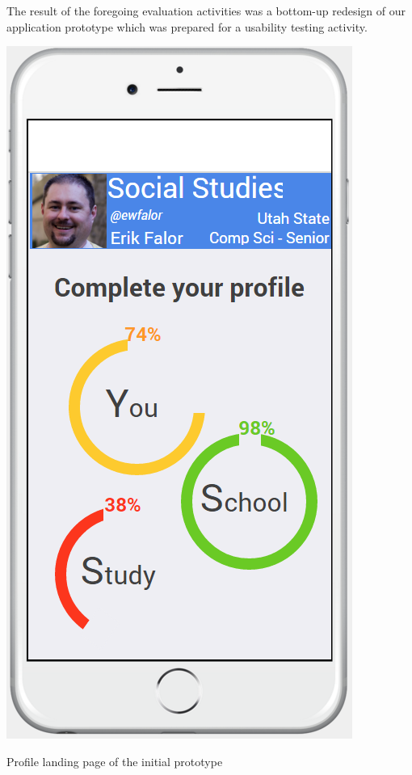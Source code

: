 \documentclass{sigchi-ext}
\begin{document}
The result of the foregoing evaluation activities was a bottom-up redesign of
our application prototype which was prepared for a usability testing activity.



\begin{marginfigure}[-55pc]
	\begin{minipage}{\marginparwidth}
		\centering
		\includegraphics[width=0.9\columnwidth]{figures/prototype1.png}
		\caption{Profile landing page of the initial prototype}~\label{fig:prototype}
	\end{minipage}
\end{marginfigure}
\end{document}
